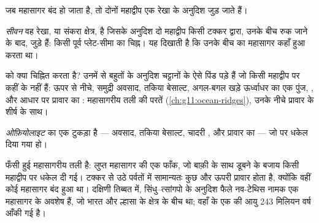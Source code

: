 जब महासागर बंद हो जाता है, तो दोनों महाद्वीप एक रेखा के अनुदिश जुड़ जाते हैं।

\begin{definition}[सीवन]\label{def:g12:mountain-building:suture}
\emph{सीवन} वह रेखा, या संकरा क्षेत्र, है जिसके अनुदिश दो
महाद्वीप किसी टक्कर द्वारा, उनके बीच  रुक जाने के बाद, जुड़े हैं:
किसी पूर्व प्लेट-सीमा का चिह्न। यह दिखाती है कि उनके बीच का महासागर
कहाँ हुआ करता था।
\end{definition}

 को क्या चिह्नित करता है? उनमें से बहुतों के अनुदिश चट्टानों के ऐसे पिंड पड़े हैं जो
किसी महाद्वीप पर कहीं के नहीं हैं: ऊपर से नीचे, समुद्री अवसाद, तकिया
बेसाल्ट, अगल-बगल खड़े ऊर्ध्वाधर  का एक पुंज, , और
आधार पर प्रावार का : महासागरीय तली की परतें
(\cref{ch:g11:ocean-ridges}), उनके नीचे प्रावार के शीर्ष के साथ।

\begin{definition}[ओफ़ियोलाइट]\label{def:g12:mountain-building:ophiolite}
\emph{ओफ़ियोलाइट}  का एक टुकड़ा है ---
अवसाद, तकिया बेसाल्ट, चादरी ,  और प्रावार का  ---
जो  पर धकेल दिया गया हो।
\end{definition}

 फँसी हुई महासागरीय तली है: लुप्त महासागर की एक फाँक, जो
बाक़ी के साथ डूबने के बजाय किसी महाद्वीप पर धकेल दी गई। टक्कर से उठे
पर्वतों में सामान्यतः कुछ  और ऊपरी प्रावार होता है, क्योंकि वहीं
कोई महासागर बंद हुआ था। दक्षिणी तिब्बत में, सिंधु--त्सांगपो  के अनुदिश
फैले  नव-टेथिस नामक एक महासागर के अवशेष हैं, जो
भारत और ल्हासा के क्षेत्र के बीच था; वहाँ के एक  की आयु
243 मिलियन वर्ष आँकी गई है।

